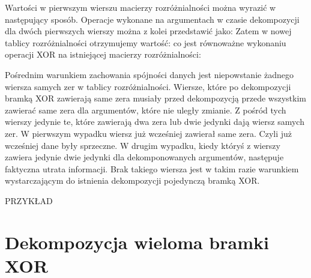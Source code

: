 Wartości w pierwszym wierszu macierzy rozróżnialności można wyrazić w następujący sposób.
Operacje wykonane na argumentach w czasie dekompozycji dla dwóch pierwszych wierszy można z kolei przedstawić jako:
Zatem w nowej tablicy rozróżnialności otrzymujemy wartość:
 co jest równoważne wykonaniu operacji XOR na istniejącej macierzy rozróżnialności:

Pośrednim warunkiem zachowania spójności danych jest niepowstanie żadnego wiersza samych zer w tablicy rozróżnialności.
Wiersze, które po dekompozycji bramką XOR zawierają same zera musiały przed dekompozycją przede wszystkim zawierać same zera dla argumentów, które nie uległy zmianie.
Z pośród tych wierszy jedynie te, które zawierają dwa zera lub dwie jedynki dają wiersz samych zer.
W pierwszym wypadku wiersz już wcześniej zawierał same zera.
Czyli już wcześniej dane były sprzeczne.
W drugim wypadku, kiedy któryś z wierszy zawiera jedynie dwie jedynki dla dekomponowanych argumentów, następuje faktyczna utrata informacji.
Brak takiego wiersza jest w takim razie warunkiem wystarczającym do istnienia dekompozycji pojedynczą bramką XOR.

PRZYKŁAD


\section{Dekompozycja wieloma bramki XOR}

